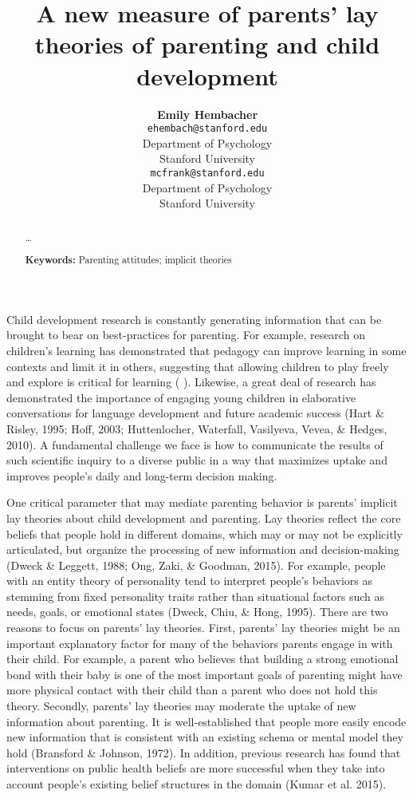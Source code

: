 \documentclass[10pt, letterpaper]{article}
\title{A new measure of parents' lay theories of parenting and child
development}
\author{{\large \bf Emily Hembacher} \\ \texttt{ehembach@stanford.edu} \\ Department of Psychology \\ Stanford University \And {\large \bf Michael C. Frank} \\ \texttt{mcfrank@stanford.edu} \\ Department of Psychology \\ Stanford University}
\begin{document}
\maketitle

\begin{abstract}
\ldots{}

\textbf{Keywords:}
Parenting attitudes; implicit theories
\end{abstract}

Child development research is constantly generating information that can
be brought to bear on best-practices for parenting. For example,
research on children's learning has demonstrated that pedagogy can
improve learning in some contexts and limit it in others, suggesting
that allowing children to play freely and explore is critical for
learning (\cite{bonawitz2011} \cite{buchsbaum2011}). Likewise, a great
deal of research has demonstrated the importance of engaging young
children in elaborative conversations for language development and
future academic success (Hart \& Risley, 1995; Hoff, 2003; Huttenlocher,
Waterfall, Vasilyeva, Vevea, \& Hedges, 2010). A fundamental challenge
we face is how to communicate the results of such scientific inquiry to
a diverse public in a way that maximizes uptake and improves people's
daily and long-term decision making.

One critical parameter that may mediate parenting behavior is parents'
implicit lay theories about child development and parenting. Lay
theories reflect the core beliefs that people hold in different domains,
which may or may not be explicitly articulated, but organize the
processing of new information and decision-making (Dweck \& Leggett,
1988; Ong, Zaki, \& Goodman, 2015). For example, people with an entity
theory of personality tend to interpret people's behaviors as stemming
from fixed personality traits rather than situational factors such as
needs, goals, or emotional states (Dweck, Chiu, \& Hong, 1995). There
are two reasons to focus on parents' lay theories. First, parents' lay
theories might be an important explanatory factor for many of the
behaviors parents engage in with their child. For example, a parent who
believes that building a strong emotional bond with their baby is one of
the most important goals of parenting might have more physical contact
with their child than a parent who does not hold this theory. Secondly,
parents' lay theories may moderate the uptake of new information about
parenting. It is well-established that people more easily encode new
information that is consistent with an existing schema or mental model
they hold (Bransford \& Johnson, 1972). In addition, previous research
has found that interventions on public health beliefs are more
successful when they take into account people's existing belief
structures in the domain (Kumar et al. 2015).
\end{document}
